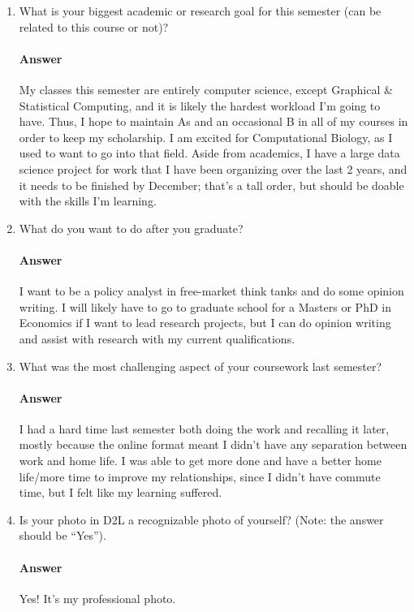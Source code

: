 \documentclass{article}
\begin{document}
\begin{enumerate}
     \item What is your biggest academic or research goal for this semester (can
         be related to this course or not)?

         \paragraph{Answer}{My classes this semester are entirely computer science, except Graphical \& Statistical Computing, and it is likely the hardest workload I'm going to have. Thus, I hope to maintain As and an occasional B in all of my courses in order to keep my scholarship. I am excited for Computational Biology, as I used to want to go into that field. Aside from academics, I have a large data science project for work that I have been organizing over the last 2 years, and it needs to be finished by December; that's a tall order, but should be doable with the skills I'm learning.} 

     \item What do you want to do after you graduate?

         \paragraph{Answer}{I want to be a policy analyst in free-market think tanks and do some opinion writing. I will likely have to go to graduate school for a Masters or PhD in Economics if I want to lead research projects, but I can do opinion writing and assist with research with my current qualifications.} 

     \item What was the most challenging aspect of your coursework last semester?

         \paragraph{Answer}{I had a hard time last semester both doing the work and recalling it later, mostly because the online format meant I didn't have any separation between work and home life. I was able to get more done and have a better home life/more time to improve my relationships, since I didn't have commute time, but I felt like my learning suffered.} 

    \item Is your photo in D2L a recognizable photo of yourself?  (Note: the
        answer should be ``Yes'').

         \paragraph{Answer}{Yes! It's my professional photo.} 

\end{enumerate}
\end{document}
